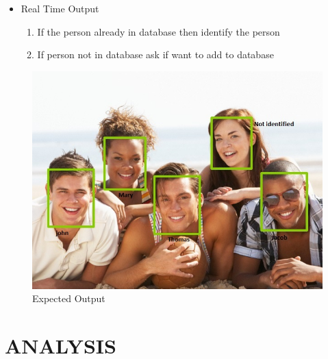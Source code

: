 \documentclass[10pt,a4paper,twoside]{report}
\newcommand\blankpage{
	\null
	\thispagestyle{empty}
	\addtocounter{page}{-1}
	\newpage}
\begin{document}
\begin{itemize}
\item Real Time Output
\begin{enumerate}
\item If the person already in database then identify the person
\item If person not in database ask if want to add to database

\end{enumerate}

\end{itemize}
\begin{figure}[htpb]

\begin{center}
\includegraphics[scale=.5]{out}
\caption{Expected Output }
\end{center}

\end{figure}

\newpage
\blankpage
\chapter{ANALYSIS}
\end{document}
